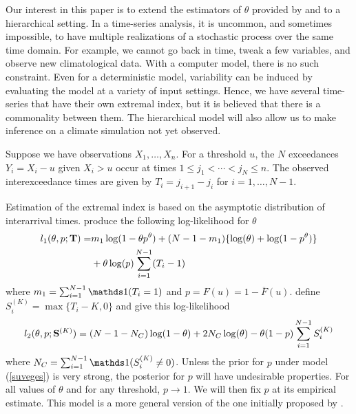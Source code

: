 Our interest in this paper is to extend the estimators of $\theta$ provided by \cite{ferro2003inference} and \cite{suveges2010model} to a hierarchical setting. In a time-series analysis, it is uncommon, and sometimes impossible, to have multiple realizations of a stochastic process over the same time domain. For example, we cannot go back in time, tweak a few variables, and observe new climatological data. With a computer model, there is no such constraint. Even for a deterministic model, variability can be induced by evaluating the model at a variety of input settings. Hence, we have several time-series that have their own extremal index, but it is believed that there is a commonality between them. The hierarchical model will also allow us to make inference on a climate simulation not yet observed.

Suppose we have observations $X_1,\ldots,X_n$. For a threshold $u$, the $N$ exceedances $Y_i=X_i-u$ given $X_i>u$ occur at times $1\leq j_1<\cdots< j_N\leq n$. The observed interexceedance times are given by $T_i=j_{i+1}-j_i$ for $i=1,\ldots,N-1$.

Estimation of the extremal index is based on the asymptotic distribution of interarrival times. \cite{ferro2003inference} produce the following log-likelihood for $\theta$
\begin{align}
l_1(\theta, p; \mathbf{\bm{T}}) =& m_1\log(1-\theta p^\theta) + (N-1-m_1)\{\log(\theta)+ \log(1-p^\theta)\} \nonumber \\
 &+ \theta\log(p)\sum_{i=1}^{N-1}(T_i-1) \label{ferro}
\end{align}
where $m_1=\sum_{i=1}^{N-1}\ind(T_i=1)$ and $p=F(u)=1-\overline{F}(u)$. \cite{suveges2010model} define $S_i^{(K)}=\max\{T_i-K,0\}$ and give this log-likelihood
\begin{align}
l_2(\theta, p; \mathbf{\bm{S}}^{(K)})= (N-1-N_C)\log(1-\theta)+2N_C\log(\theta)-\theta (1-p) \sum_{i=1}^{N-1}S_i^{(K)} \label{suveges}
\end{align}
where $N_C=\sum_{i=1}^{N-1}\ind(S_i^{(K)} \neq 0)$. Unless the prior for $p$ under model (\ref{suveges}) is very strong, the posterior for $p$ will have undesirable properties. For all values of $\theta$ and for any threshold, $p\rightarrow 1$. We will then fix $p$ at its empirical estimate. This model is a more general version of the one initially proposed by \cite{suveges2007likelihood}.
